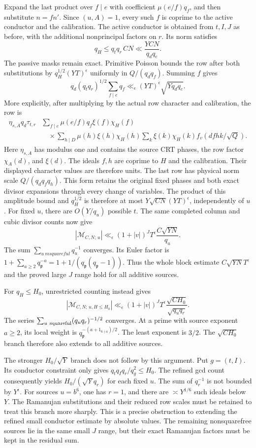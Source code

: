 \documentclass[11pt]{article}
\begin{document}
Expand the last product over $f\mid e$ with coefficient
$\mu(e/f)q_f$, and then substitute $n=f n'$. Since $(u,A)=1$, every
such $f$ is coprime to the active conductor and the calibration.
The active conductor is obtained from $t,I,J$ as before, with the
additional nonprincipal factors on $r$. Its norm satisfies
\[
 q_H\le q_tq_r\,C N\ll\frac{Y C N}{q_dq_e}.
\]
The passive masks remain exact. Primitive Poisson bounds the row after
both substitutions by $q_H^{1/2}(YT)^\epsilon$ uniformly in
$Q/(q_dq_f)$. Summing $f$ gives
\[
 q_d(q_tq_r)^{1/2}\sum_{f\mid e}q_f
     \ll_\epsilon (YT)^\epsilon\sqrt{Yq_dq_e}.
\]
More explicitly, after multiplying by the actual row character and
calibration, the row is
\[
 \begin{aligned}
 \eta_{s,A}q_d\tau_{t,r}
   &\sum_{f\mid e}\mu(e/f)q_f\xi(f)\chi_H(f) \\
   &\quad {}\times
   \sum_{h\mid D}\mu(h)\xi(h)\chi_H(h)
   \sum_k\xi(k)\chi_H(k)f_v(dfhk/\sqrt Q).
 \end{aligned}
\]
Here $\eta_{s,A}$ has modulus one and contains the source CRT phases,
the row factor $\chi_A(d)$, and $\xi(d)$.
The ideals $f,h$ are coprime to $H$ and the calibration. Their displayed
character values are therefore units. The last row has physical norm
scale $Q/(q_dq_fq_h)$. This form retains the original fixed phases and
both exact divisor expansions through every change of variables.
The product of this amplitude bound and $q_H^{1/2}$ is therefore at
most $Y\sqrt{C N}(YT)^\epsilon$, independently of $u$.
For fixed $u$, there are $O(Y/q_u)$ possible $t$. The same completed
column and cubic divisor counts now give
\[
 |\mathcal M_{C,N;\,u}|\ll_\epsilon
       (1+|v|)^J T^\epsilon\frac{C\sqrt{Y N}}{q_u}.
\]
The sum $\sum_{u\ {
m squareful}}q_u^{-1}$ converges. Its Euler factor
is $1+\sum_{a\ge2}q_{\mathfrak p}^{-a}=1+1/(q_{\mathfrak p}(q_{\mathfrak p}-1))$.
Thus the whole block estimate $C\sqrt{Y N}T^\epsilon$ and the proved
large $J$ range hold for all additive sources.

For $q_H\le H_0$, unrestricted counting instead gives
\[
 |\mathcal M_{C,N;\,u,H\le H_0}|\ll_\epsilon
       (1+|v|)^J T^\epsilon
       \frac{\sqrt{C H_0}}{\sqrt{q_uq_r}}.
\]
The series $\sum_{u\ {\rm squareful}}(q_uq_r)^{-1/2}$ converges.
At a prime with source exponent $a\ge2$, its local weight is
$q_{\mathfrak p}^{-(a+1_{6\nmid a})/2}$. The least exponent is $3/2$.
The $\sqrt{C H_0}$ branch therefore also extends to all additive sources.

The stronger $H_0/\sqrt Y$ branch does not follow by this argument.
Put $g=(t,I)$. Its conductor constraint only gives
$q_tq_Iq_r/q_g^2\le H_0$. The refined gcd count consequently yields
$H_0/(\sqrt Y q_r)$ for each fixed $u$.
The sum of $q_r^{-1}$ is not bounded by $Y^\epsilon$. For sources
$u=b^6$, one has $r=1$, and there are $\asymp Y^{1/6}$ such ideals
below $Y$. The Ramanujan substitutions and their reduced row scales
must be retained to treat this branch more sharply.
This is a precise obstruction to extending the refined small conductor
estimate by absolute values. The remaining nonsquarefree sources lie
in the same small $J$ range, but their exact Ramanujan factors must be
kept in the residual sum.
\end{document}
